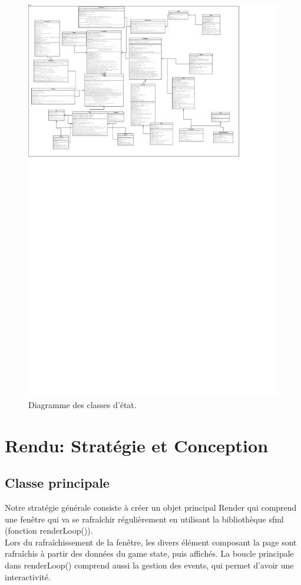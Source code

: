 \documentclass[a4paper,12pt]{article}
\begin{document}
\begin{landscape}
\begin{figure}[p]
\includegraphics[width=\paperheight]{state.pdf}
\caption{\label{uml:state}Diagramme des classes d'état.} 
\end{figure}
\end{landscape}

\clearpage
\section{Rendu: Stratégie et Conception}

\subsection{Classe principale}
Notre stratégie générale consiste à créer un objet principal Render qui comprend une fenêtre qui va se rafraîchir régulièrement en utilisant la bibliothèque sfml (fonction renderLoop()).\\
Lors du rafraîchissement de la fenêtre, les divers élément composant la page sont rafraîchis à partir des données du game state, puis affichés. La boucle principale dans renderLoop() comprend aussi la gestion des events, qui permet d'avoir une interactivité. \\
\end{document}
